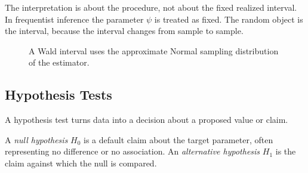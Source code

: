 The interpretation is about the procedure, not about the fixed realized interval. In frequentist inference the parameter $\psi$ is treated as fixed. The random object is the interval, because the interval changes from sample to sample.

\begin{figure}[H]
\centering
{}

\caption{
A Wald interval uses the approximate Normal sampling distribution of the estimator.
}
\end{figure}

\subsection{Hypothesis Tests}

A hypothesis test turns data into a decision about a proposed value or claim.

\begin{definition}
A \emph{null hypothesis} $H_0$ is a default claim about the target parameter, often representing no difference or no association. An \emph{alternative hypothesis} $H_1$ is the claim against which the null is compared.
\end{definition}

